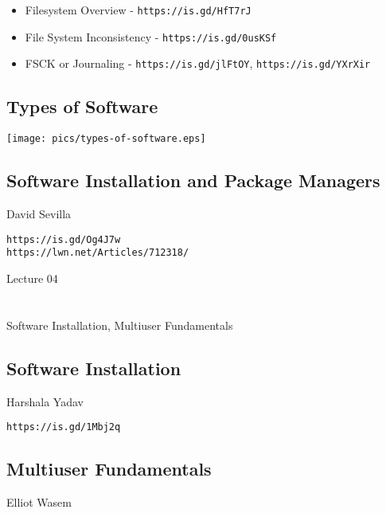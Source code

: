 \documentclass[xga]{xdvislides}
\begin{document}
\begin{itemize}
	\item Filesystem Overview - \verb+https://is.gd/HfT7rJ+
	\item File System Inconsistency - \verb+https://is.gd/0usKSf+
	\item FSCK or Journaling - \verb+https://is.gd/jlFtOY+, \verb+https://is.gd/YXrXir+
\end{itemize}

\subsection{Types of Software}
\vfill
\begin{center}
	\texttt{[image: pics/types-of-software.eps]}
\end{center}
\vfill

\subsection{Software Installation and Package Managers}
David Sevilla\\
\vspace{1in}

\verb+https://is.gd/Og4J7w+ \\
\verb+https://lwn.net/Articles/712318/+

\newpage
\vspace*{\fill}
\begin{center}
    \Hugesize
        Lecture 04 \\ [1em]
    \hspace*{5mm}
    \blueline\\
    \hspace*{5mm}\\
	Software Installation, Multiuser Fundamentals
\end{center}
\vspace*{\fill}

\subsection{Software Installation}
Harshala Yadav\\
\vspace{1in}

\verb+https://is.gd/1Mbj2q+

\subsection{Multiuser Fundamentals}
Elliot Wasem\\
\vspace{1in}
\end{document}

